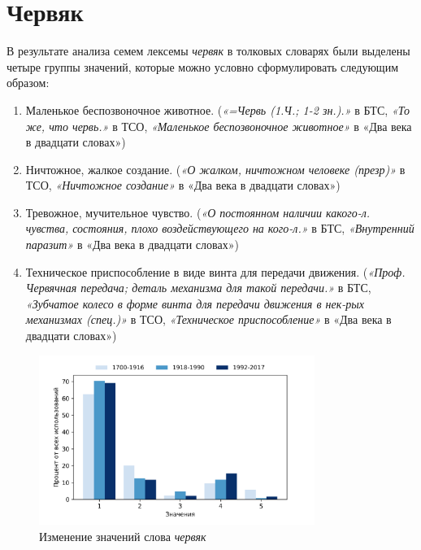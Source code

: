 \section*{Червяк}

В результате анализа семем лексемы \textit{червяк} в толковых словарях были выделены четыре группы значений,
которые можно условно сформулировать следующим образом:

\begin{enumerate}
    \item Маленькое беспозвоночное животное.
    (\textit{«=Червь (1.Ч.; 1-2 зн.).»} в БТС,
    \textit{«То же, что червь.»} в ТСО,
    \textit{«Маленькое беспозвоночное животное»} в «Два века в двадцати словах»)

    \item Ничтожное, жалкое создание.
    (\textit{«О жалком, ничтожном человеке (презр)»} в ТСО,
    \textit{«Ничтожное создание»} в «Два века в двадцати словах»)

    \item Тревожное, мучительное чувство.
    (\textit{«О постоянном наличии какого-л. чувства, состояния, плохо воздействующего на кого-л.»} в БТС,
\textit{«Внутренний паразит»} в «Два века в двадцати словах»)

    \item Техническое приспособление в виде винта для передачи движения.
    (\textit{«Проф. Червячная передача; деталь механизма для такой передачи.»} в БТС,
    \textit{«Зубчатое колесо в форме винта для передачи движения в нек-рых механизмах (спец.)»} в ТСО,
    \textit{«Техническое приспособление»} в «Два века в двадцати словах»)
\end{enumerate}

\begin{figure}[H]
	\centering
	\includegraphics[width=0.8\textwidth]{img/visualizations/chervjak_minimal}
	\caption{Изменение значений слова \textit{червяк}}
	\label{fig:Червяк}
\end{figure}

